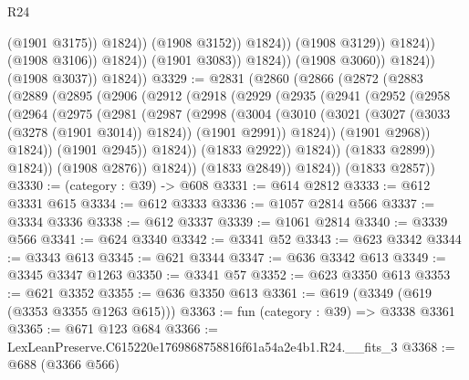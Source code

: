 \begin{lexlean}{R24}
\begin{coremodule}
                                              (@1901 @3175))
                                            @1824))
                                        (@1908 @3152))
                                      @1824))
                                  (@1908 @3129))
                                @1824))
                            (@1908 @3106))
                          @1824))
                      (@1901 @3083))
                    @1824))
                (@1908 @3060))
              @1824))
          (@1908 @3037))
        @1824))
@3329 := @2831
    (@2860
      (@2866
        (@2872
          (@2883
            (@2889
              (@2895
                (@2906
                  (@2912
                    (@2918
                      (@2929
                        (@2935
                          (@2941
                            (@2952
                              (@2958
                                (@2964
                                  (@2975
                                    (@2981
                                      (@2987
                                        (@2998
                                          (@3004
                                            (@3010
                                              (@3021
                                                (@3027 (@3033 (@3278 (@1901 @3014)) @1824))
                                                (@1901 @2991))
                                              @1824))
                                          (@1901 @2968))
                                        @1824))
                                    (@1901 @2945))
                                  @1824))
                              (@1833 @2922))
                            @1824))
                        (@1833 @2899))
                      @1824))
                  (@1908 @2876))
                @1824))
            (@1833 @2849))
          @1824))
      (@1833 @2857))
@3330 := (category : @39) -> @608
@3331 := @614 @2812
@3333 := @612 @3331 @615
@3334 := @612 @3333
@3336 := @1057 @2814 @566
@3337 := @3334 @3336
@3338 := @612 @3337
@3339 := @1061 @2814
@3340 := @3339 @566
@3341 := @624 @3340
@3342 := @3341 @52
@3343 := @623 @3342
@3344 := @3343 @613
@3345 := @621 @3344
@3347 := @636 @3342 @613
@3349 := @3345 @3347 @1263
@3350 := @3341 @57
@3352 := @623 @3350 @613
@3353 := @621 @3352
@3355 := @636 @3350 @613
@3361 := @619 (@3349 (@619 (@3353 @3355 @1263 @615)))
@3363 := fun (category : @39) => @3338 @3361
@3365 := @671 @123 @684
@3366 := LexLeanPreserve.C615220e1769868758816f61a54a2e4b1.R24.__fits_3
@3368 := @688 (@3366 @566)

\end{coremodule}
\end{lexlean}
